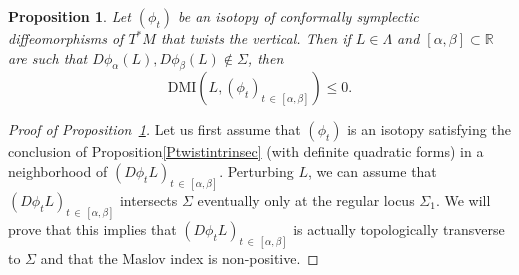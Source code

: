 \documentclass[10pt,a4paper]{amsart}
\numberwithin{equation}{section}
\newcommand{\DMI}{\mathrm{DMI}}
\newcommand*\R{\mathbb{R}}
\newtheorem{prop}[theo]{Proposition}
\theoremstyle{definition}
\theoremstyle{remark}
\begin{document}
\begin{prop}\label{PtwistMAslov}
Let $(\phi_t)$ be an isotopy of conformally symplectic diffeomorphisms of $T^*M$ that twists the vertical. Then if $L\in\Lambda$ and $[\alpha, \beta]\subset \R$ are such that $D\phi_\alpha(L), D\phi_\beta(L)\notin \Sigma$, then
\[
\DMI\left(L, (\phi_{ t})_{t\,\in\,[\alpha, \beta]}\right)\leq 0.
\]
\end{prop}

\begin{proof}[Proof of Proposition~\ref{PtwistMAslov}]
Let us first assume that $(\phi_t)$ is an isotopy {satisfying the conclusion of Proposition\ref{Ptwistintrinsec} (with definite quadratic forms) in a neighborhood of $(D\phi_tL)_{t\,\in\,[\alpha,\beta]}$.} Perturbing $L$, we can assume that $(D\phi_{ t}L)_{t\,\in\,[\alpha, \beta]}$ intersects $\Sigma$ eventually only at the regular locus $\Sigma_1$. We will prove that this implies that $(D\phi_{ t}L)_{t\,\in\,[\alpha, \beta]}$ is actually topologically transverse to $\Sigma$ and that the Maslov index is non-positive.


\end{proof}
\end{document}
